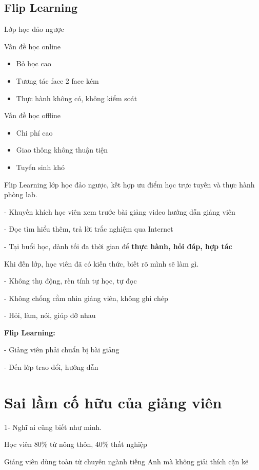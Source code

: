 \subsection{Flip Learning}

Lớp học đảo ngược

Vấn đề học online

\begin{itemize}
  \item Bỏ học cao
  \item Tương tác face 2 face kém
  \item Thực hành không có, không kiểm soát
\end{itemize}

Vấn đề học offline

\begin{itemize}
  \item Chi phí cao
  \item Giao thông không thuận tiện
  \item Tuyển sinh khó
\end{itemize}

Flip Learning lớp học đảo ngược, kết hợp ưu điểm học trực tuyến và thực hành phòng lab.

- Khuyến khích học viên xem trước bài giảng video hướng dẫn giảng viên

- Đọc tìm hiểu thêm, trả lời trắc nghiệm qua Internet

- Tại buổi học, dành tối đa thời gian để \textbf{thực hành, hỏi đáp, hợp tác}

Khi đến lớp, học viên đã có kiến thức, biết rõ mình sẽ làm gì.

- Không thụ động, rèn tính tự học, tự đọc

- Không chống cằm nhìn giảng viên, không ghi chép

- Hỏi, làm, nói, giúp đỡ nhau

\textbf{Flip Learning:}

- Giảng viên phải chuẩn bị bài giảng

- Đến lớp trao đổi, hướng dẫn


\section{Sai lầm cố hữu của giảng viên}

1- Nghĩ ai cũng biết như mình.

Học viên 80\% từ nông thôn, 40\% thất nghiệp

Giảng viên dùng toàn từ chuyên ngành tiếng Anh mà không giải thích cặn kẽ

